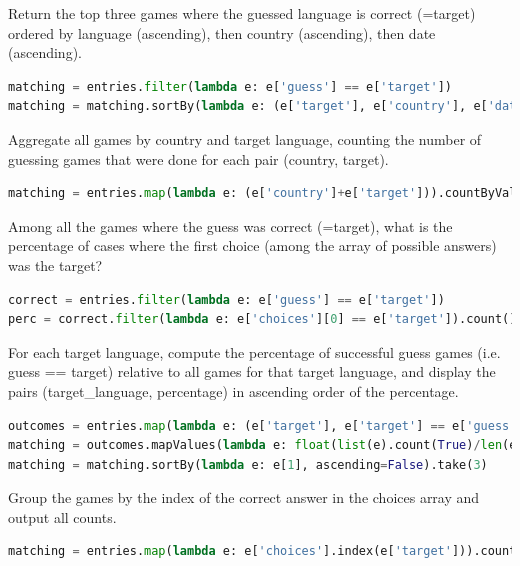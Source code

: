 \documentclass[11pt,oneside,a4paper]{article}
\begin{document}
Return the top three games where the guessed language is correct (=target) ordered by language (ascending), then country (ascending), then date (ascending).

\begin{lstlisting}[language=Python,basicstyle=\small,columns=flexible]
matching = entries.filter(lambda e: e['guess'] == e['target'])
matching = matching.sortBy(lambda e: (e['target'], e['country'], e['date'])).take(3)
\end{lstlisting}

Aggregate all games by country and target language, counting the number of guessing games that were done for each pair (country, target).

\begin{lstlisting}[language=Python,basicstyle=\small,columns=flexible]
matching = entries.map(lambda e: (e['country']+e['target'])).countByValue()
\end{lstlisting}

Among all the games where the guess was correct (=target), what is the percentage of cases where the first choice (among the array of possible answers) was the target?

\begin{lstlisting}[language=Python,basicstyle=\small,columns=flexible]
correct = entries.filter(lambda e: e['guess'] == e['target'])
perc = correct.filter(lambda e: e['choices'][0] == e['target']).count() / correct.count()
\end{lstlisting}

For each target language, compute the percentage of successful guess games (i.e. guess == target) relative to all games for that target language, and display the pairs (target\_language, percentage) in ascending order of the percentage.

\begin{lstlisting}[language=Python,basicstyle=\small,columns=flexible]
outcomes = entries.map(lambda e: (e['target'], e['target'] == e['guess'])).groupByKey()
matching = outcomes.mapValues(lambda e: float(list(e).count(True)/len(e)))
matching = matching.sortBy(lambda e: e[1], ascending=False).take(3)
\end{lstlisting}

Group the games by the index of the correct answer in the choices array and output all counts.

\begin{lstlisting}[language=Python,basicstyle=\small,columns=flexible]
matching = entries.map(lambda e: e['choices'].index(e['target'])).countByValue()
\end{lstlisting}
\end{document}
